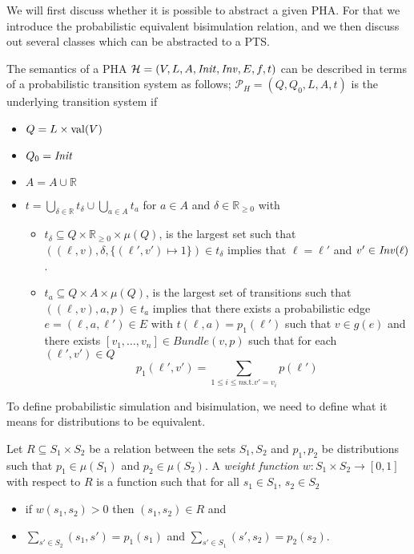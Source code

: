 We will first discuss whether it is possible to abstract a given PHA. For that we introduce the probabilistic equivalent bisimulation relation, and we then discuss out several classes which can be abstracted to a PTS.

\begin{defi}
\label{def:pha2pts}
The semantics of a PHA $\mathcal{H}=(V,L,A,\mathit{Init},\mathit{Inv},E,f,t)$ can be described in terms of a probabilistic transition system as follows; $\mathcal{P}_H=(Q,Q_{0},L,A,t)$ is the underlying transition system if
\begin{itemize}
    \item $Q=L\times\operatorname{val}(V)$
    \item $Q_{0} = \mathit{Init}$
    \item $A=A\cup\mathbb{R}$
    \item $t=\bigcup_{\delta\in\mathbb{R}}t_{\delta}\cup \bigcup_{a\in A}t_{a}$ for $a\in A$ and $\delta\in\mathbb{R}_{\geq 0}$ with
    \begin{itemize}
        \item $t_{\delta}\subseteq Q\times\mathbb{R}_{\geq0}\times\mu(Q)$, is the largest set such that $((\ell,v),\delta,\{(\ell',v')\mapsto1\})\in t_{\delta}$ implies that $\ell=\ell'$ and $v'\in \mathit{Inv}(\ell)$.
        \item $t_{a}\subseteq Q\times A \times\mu(Q)$, is the largest set of transitions such that $((\ell,v),a,p)\in t_{a}$ implies that there exists a probabilistic edge $e=(\ell,a,\ell')\in E$ with $t(\ell,a)=p_{1}(\ell')$ such that $v\in g(e)$ and there exists $[v_{1},\ldots,v_{n}]\in Bundle(v,p)$ such that for each $(\ell',v')\in Q$ \[p_{1}(\ell',v') = \sum_{1\leq i\leq n \text{s.t.} v'=v_{i}} p(\ell')\]
    \end{itemize}
\end{itemize}
\end{defi}

To define probabilistic simulation and bisimulation, we need to define what it means for distributions to be equivalent.

\begin{defi}
Let $R\subseteq S_{1} \times S_{2}$ be a relation between the sets $S_{1},S_{2}$ and $p_{1},p_{2}$ be distributions such that $p_{1}\in\mu(S_{1})$ and $p_{2}\in\mu(S_{2})$. A \emph{weight function}
 $w:S_{1}\times S_{2}\rightarrow [0,1]$ with respect to $R$ is a function such that for all $s_{1}
 \in S_{1}$, $s_{2}\in S_{2}$
 \begin{itemize}
     \item if $w(s_{1},s_{2})>0$ then $(s_{1},s_{2})\in R$ and
     \item $\sum_{s'\in S_{2}} (s_{1},s') = p_{1}(s_{1})$ and $\sum_{s'\in S_{1}} (s',s_{2}) = p_{2}(s_{2})$.
 \end{itemize}
\end{defi}

